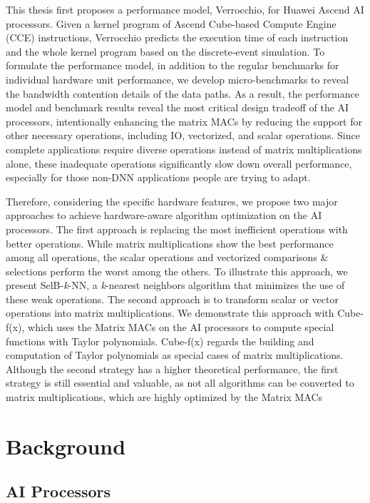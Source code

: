 \documentclass[12pt]{extbook}
\begin{document}
This thesis first proposes a performance model, Verrocchio, for Huawei Ascend AI processors. Given a kernel program of Ascend Cube-based Compute Engine (CCE) instructions, Verrocchio predicts the execution time of each instruction and the whole kernel program based on the discrete-event simulation. To formulate the performance model, in addition to the regular benchmarks for individual hardware unit performance, we develop micro-benchmarks to reveal the bandwidth contention details of the data paths. As a result, the performance model and benchmark results reveal the most critical design tradeoff of the AI processors, intentionally enhancing the matrix MACs by reducing the support for other necessary operations, including IO, vectorized, and scalar operations. Since complete applications require diverse operations instead of matrix multiplications alone, these inadequate operations significantly slow down overall performance, especially for those non-DNN applications people are trying to adapt.

Therefore, considering the specific hardware features, we propose two major approaches to achieve hardware-aware algorithm optimization on the AI processors. The first approach is replacing the most inefficient operations with better operations. While matrix multiplications show the best performance among all operations, the scalar operations and vectorized comparisons \& selections perform the worst among the others. To illustrate this approach, we present SelB-\textit{k}-NN, a \textit{k}-nearest neighbors algorithm that minimizes the use of these weak operations. The second approach is to transform scalar or vector operations into matrix multiplications. We demonstrate this approach with Cube-f(x), which uses the Matrix MACs on the AI processors to compute special functions with Taylor polynomials. Cube-f(x) regards the building and computation of Taylor polynomials as special cases of matrix multiplications. Although the second strategy has a higher theoretical performance, the first strategy is still essential and valuable, as not all algorithms can be converted to matrix multiplications, which are highly optimized by the Matrix MACs


\section{Background}
\label{sec_1_1_background}

\subsection{AI Processors}
\end{document}

